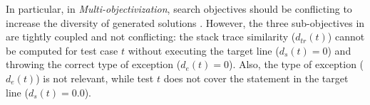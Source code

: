 In particular, in \textit{Multi-objectivization}, search objectives should be conflicting to increase the diversity of generated solutions \cite{jensen2004helper}. However, the three sub-objectives in \decomposition \cite{Soltani2018b} are tightly coupled and not conflicting: the stack trace similarity ($d_{tr}(t)$) cannot be computed for test case $t$ without executing the target line ($d_{s}(t) = 0$) and throwing the correct type of exception ($d_{e}(t) = 0$). Also, the type of exception  ($d_{e}(t)$) is not relevant, while test $t$ does not cover the statement in the target line ($d_{s}(t) = 0.0$).
